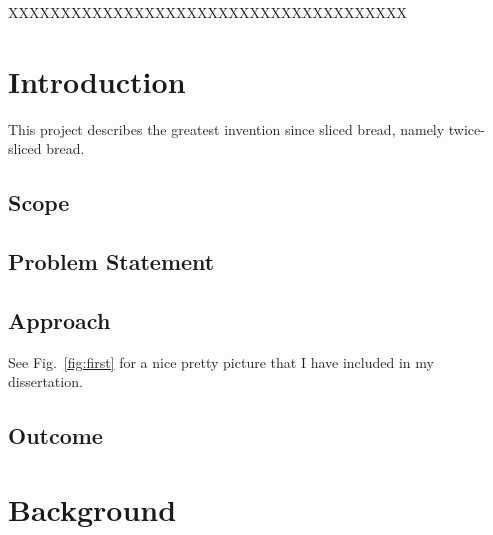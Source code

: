 \documentclass[a4paper,11pt]{report}
\begin{document}
\noindent XXXXXXXXXXXXXXXXXXXXXXXXXXXXXXXXXXXXXX


\newpage



\tableofcontents



\listoffigures


\listoftables



\newpage





\chapter{Introduction}\label{chap:intro}
 
This project describes the greatest invention since sliced bread, 
namely twice-sliced bread.  


\section{Scope}

\section{Problem Statement}\label{sec:problem}

\section{Approach}

See Fig.~\ref{fig:first} for a nice pretty picture that I have included
in my dissertation.  


\section {Outcome}




\chapter{Background}\label{chap:background}
\end{document}
